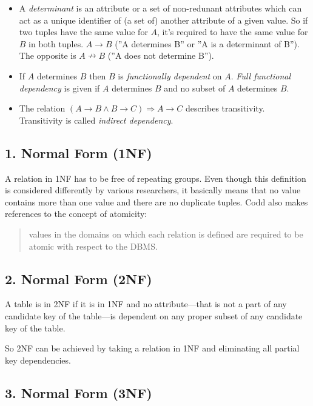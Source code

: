 \documentclass[a4paper,twocolumn]{article}
\begin{document}
\begin{itemize}
  \item A \emph{determinant} is an attribute or a set of non-redunant
    attributes which can act as a unique identifier of (a set of)
    another attribute of a given value. So if two tuples have the same
    value for $A$, it's required to have the same value for $B$ in both
    tuples.
    $A \rightarrow B$ (''A determines B'' or ''A is a determinant of B'').
    The opposite is $A \nrightarrow B$ (''A does not determine B'').
  \item If $A$ determines $B$ then $B$ is \emph{functionally dependent}
    on $A$. \emph{Full functional dependency} is given if $A$ determines
    $B$ and no subset of $A$ determines $B$.
  \item The relation $(A \rightarrow B \land B \rightarrow C) \Rightarrow
    A \rightarrow C$ describes transitivity. Transitivity is called
    \emph{indirect dependency}.
\end{itemize}

\subsection{1. Normal Form (1NF)}

A relation in 1NF has to be free of repeating groups. Even though this
definition is considered differently by various researchers, it basically
means that no value contains more than one value and there are no duplicate
tuples. Codd also makes references to the concept of atomicity:
%
\begin{quote}
    values in the domains on which each relation is defined are required to
    be atomic with respect to the DBMS.
\end{quote}

\subsection{2. Normal Form (2NF)}

A table is in 2NF if it is in 1NF and no attribute---that is not a part
of any candidate key of the table---is dependent on any proper subset of
any candidate key of the table.

So 2NF can be achieved by taking a relation in 1NF and eliminating all
partial key dependencies.

\subsection{3. Normal Form (3NF)}
\end{document}
